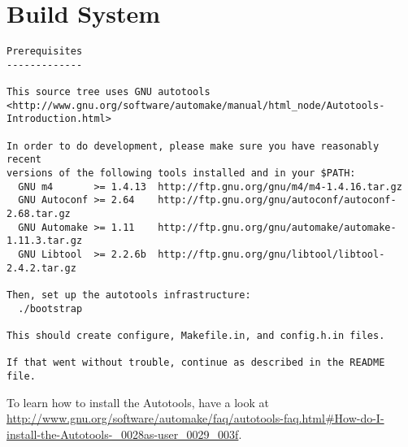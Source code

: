 \chapter{Build System}
\label{cha:buildsystem}

\begin{verbatim}
Prerequisites
-------------

This source tree uses GNU autotools
<http://www.gnu.org/software/automake/manual/html_node/Autotools-Introduction.html>

In order to do development, please make sure you have reasonably recent
versions of the following tools installed and in your $PATH:
  GNU m4       >= 1.4.13  http://ftp.gnu.org/gnu/m4/m4-1.4.16.tar.gz
  GNU Autoconf >= 2.64    http://ftp.gnu.org/gnu/autoconf/autoconf-2.68.tar.gz
  GNU Automake >= 1.11    http://ftp.gnu.org/gnu/automake/automake-1.11.3.tar.gz
  GNU Libtool  >= 2.2.6b  http://ftp.gnu.org/gnu/libtool/libtool-2.4.2.tar.gz

Then, set up the autotools infrastructure:
  ./bootstrap

This should create configure, Makefile.in, and config.h.in files.

If that went without trouble, continue as described in the README file.
\end{verbatim}

To learn how to install the Autotools, have a look at
\url{http://www.gnu.org/software/automake/faq/autotools-faq.html#How-do-I-install-the-Autotools-_0028as-user_0029_003f}.

